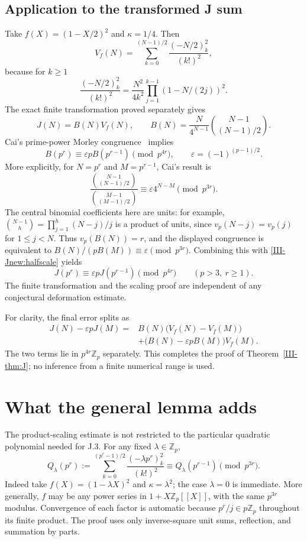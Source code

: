 \documentclass[11pt,letterpaper]{article}
\numberwithin{equation}{section}
\newcommand{\Zp}{\mathbb Z_p}
\begin{document}
\subsection{Application to the transformed J sum}
Take $f(X)=(1-X/2)^2$ and $\kappa=1/4$. Then
\[
 V_f(N)=\sum_{k=0}^{(N-1)/2}\frac{(-N/2)_k^2}{(k!)^2},
\]
because for $k\ge1$
\[
 \frac{(-N/2)_k^2}{(k!)^2}
 =\frac{N^2}{4k^2}\prod_{j=1}^{k-1}(1-N/(2j))^2.
\]
The exact finite transformation proved separately gives
\begin{equation}\label{III-Jnew:factor}
 J(N)=B(N)V_f(N),\qquad
 B(N)=\frac{N}{4^{N-1}}\binom{N-1}{(N-1)/2}.
\end{equation}
Cai's prime-power Morley congruence~\cite[Corollary 3]{III-Cai} implies
\[
 B(p^r)\equiv\varepsilon p B(p^{r-1})\pmod{p^{4r}},
 \qquad \varepsilon=(-1)^{(p-1)/2}.
\]
More explicitly, for $N=p^r$ and $M=p^{r-1}$, Cai's result is
\[
 \frac{\binom{N-1}{(N-1)/2}}{\binom{M-1}{(M-1)/2}}
 \equiv\varepsilon4^{N-M}\pmod{p^{3r}}.
\]
The central binomial coefficients here are units: for example,
$\binom{N-1}{h}=\prod_{j=1}^h(N-j)/j$ is a product of units,
since $v_p(N-j)=v_p(j)$ for $1\le j<N$. Thus $v_p(B(N))=r$,
and the displayed congruence is equivalent to
$B(N)/(pB(M))\equiv\varepsilon\pmod{p^{3r}}$. Combining this with \eqref{III-Jnew:halfscale} yields
\[
 \boxed{J(p^r)\equiv\varepsilon pJ(p^{r-1})
        \pmod{p^{4r}}\qquad(p>3,\ r\ge1).}
\]
The finite transformation and the scaling proof are independent of
any conjectural deformation estimate.

For clarity, the final error splits as
\[
 \begin{aligned}
 J(N)-\varepsilon pJ(M)
 ={}&B(N)\bigl(V_f(N)-V_f(M)\bigr)\\
 &+\bigl(B(N)-\varepsilon pB(M)\bigr)V_f(M).
 \end{aligned}
\]
The two terms lie in $p^{4r}\Zp$ separately. This completes the proof
of Theorem~\ref{III-thm:J}; no inference from a finite numerical range is used.

\section{What the general lemma adds}\label{loc-III-4}
The product-scaling estimate is not restricted to the particular
quadratic polynomial needed for J.3. For any fixed $\lambda\in\Zp$,
\[
 Q_\lambda(p^r):=\sum_{k=0}^{(p^r-1)/2}
                    \frac{(-\lambda p^r)_k^2}{(k!)^2}
 \equiv Q_\lambda(p^{r-1})\pmod{p^{3r}}.
\]
Indeed take $f(X)=(1-\lambda X)^2$ and $\kappa=\lambda^2$;
the case $\lambda=0$ is immediate. More generally, $f$ may be any
power series in $1+X\Zp[[X]]$, with the same $p^{3r}$ modulus.
Convergence of each factor is automatic because $p^r/j\in p\Zp$
throughout its finite product. The proof uses only inverse-square
unit sums, reflection, and summation by parts.
\end{document}
